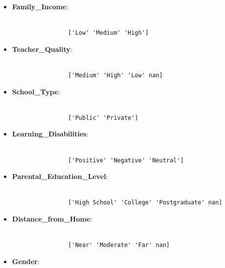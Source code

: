 \documentclass{article}
\begin{document}
\begin{enumerate}
\begin{itemize}
\begin{itemize}
\begin{verbatim}
                ['Yes' 'No']

            \end{verbatim}

            \item \textbf{Family\_Income}:
            \begin{verbatim}

                ['Low' 'Medium' 'High']

            \end{verbatim}

            \item \textbf{Teacher\_Quality}:
            \begin{verbatim}

                ['Medium' 'High' 'Low' nan]

            \end{verbatim}

            \item \textbf{School\_Type}:
            \begin{verbatim}

                ['Public' 'Private']

            \end{verbatim}

            \item \textbf{Learning\_Disabilities}:
            \begin{verbatim}

                ['Positive' 'Negative' 'Neutral']

            \end{verbatim}

            \item \textbf{Parental\_Education\_Level}:
            \begin{verbatim}

                ['High School' 'College' 'Postgraduate' nan]

            \end{verbatim}

            \item \textbf{Distance\_from\_Home}:
            \begin{verbatim}

                ['Near' 'Moderate' 'Far' nan]

            \end{verbatim}

            \item \textbf{Gender}:
            \begin{verbatim}


\end{verbatim}
\end{itemize}
\end{itemize}
\end{enumerate}
\end{document}
